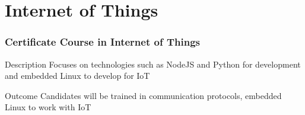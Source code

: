 \section{Internet of Things}
\begin{frame}
	\frametitle{Certificate Course in Internet of Things}
	\begin{block}{Description}
	  	Focuses on technologies such as NodeJS and Python for development and embedded
		Linux to develop for IoT  
	\end{block}
\begin{exampleblock}{Outcome}
	Candidates will be trained in communication protocols, embedded
	Linux to work with IoT  
\end{exampleblock}
\end{frame}







